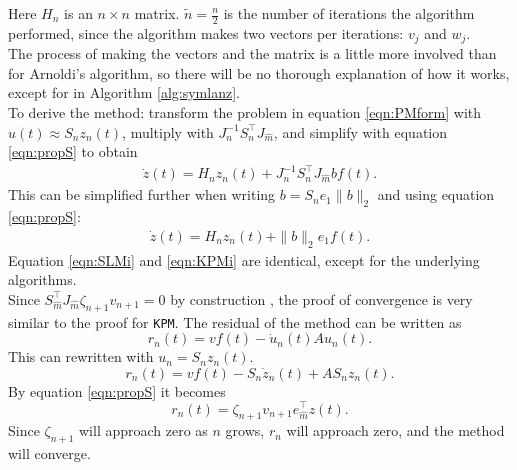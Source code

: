 \noindent Here $H_n$ is an $ n \times n $ matrix. $ \tilde{n} = \frac{n}{2}$ is the number of iterations the algorithm performed, since the algorithm makes two vectors per iterations: $v_j$ and $w_j$. \\

\noindent The process of making the vectors and the matrix is a little more involved than for Arnoldi's algorithm, so there will be no thorough explanation of how it works, except for in Algorithm \ref{alg:symlanz}.\\

\noindent To derive the method: transform the problem in equation \eqref{eqn:PMform} with $u(t) \approx S_n z_n(t)$, multiply with $J^{-1}_n S_n^\top J_{ \hat{m} }$, and simplify with equation \eqref{eqn:propS} to obtain
\begin{equation*}
\begin{aligned}
\dot{z}(t) = H_n z_n(t) + J_n^{-1} S_n^\top J_{\hat{m}} b f(t).
\end{aligned}
\end{equation*}
This can be simplified further when writing $ b = S_n e_1 \| b \|_2 $ and using equation \eqref{eqn:propS}:
\begin{equation}
\begin{aligned}
\dot{z}(t) = H_n z_n(t) + \|b \|_2 e_1 f(t).
\end{aligned}
\label{eqn:SLMi}
\end{equation}
Equation \eqref{eqn:SLMi} and \eqref{eqn:KPMi} are identical, except for the underlying algorithms. \\

\noindent Since $ S_{\hat{m}}^\top J_{\hat{m}} \zeta_{n+1} v_{n+1} = 0 $ by construction \cite{SLMconv}, the proof of convergence is very similar to the proof for \texttt{KPM}. The residual of the method can be written as
\begin{equation*}
r_n(t) = v f(t) - \dot{u}_n(t) A u_n(t).
\end{equation*}
This can rewritten with $u_n = S_n z_n(t)$.
\begin{equation*}
r_n(t) = v f(t) -S_n \dot{z}_n(t) + A S_n z_n(t).
\end{equation*}
By equation \eqref{eqn:propS} it becomes
\begin{equation*}
r_n(t) =  \zeta_{n+1} v_{n+1} e_{\hat{m}}^\top z(t).
\end{equation*}
Since $\zeta_{n+1}$ will approach zero as $n$ grows, $r_n$ will approach zero, and the method will converge. \\


